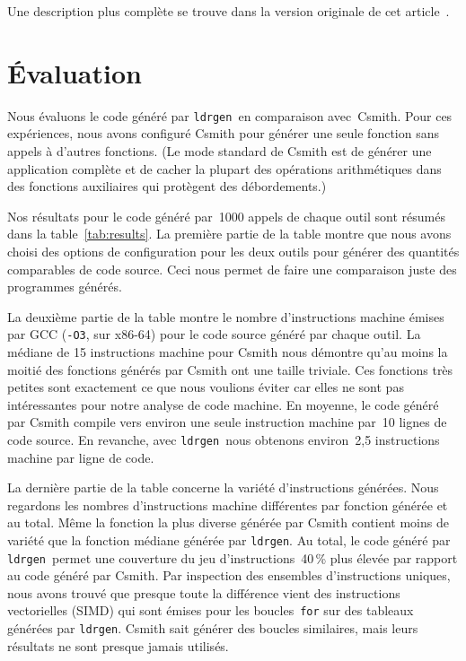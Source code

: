 \documentclass[a4paper]{easychair}
\newcommand\ldrgen{\texttt{ldrgen}}
\begin{document}

Une description plus complète se trouve dans la version originale de cet
article~\cite{ldrgen-2017}.


\section{Évaluation}

Nous évaluons le code généré par \ldrgen\ en comparaison avec~Csmith. Pour
ces expériences, nous avons configuré Csmith pour générer une seule
fonction sans appels à d'autres fonctions. (Le mode standard de Csmith est de
générer une application complète et de cacher la plupart des opérations
arithmétiques dans des fonctions auxiliaires qui protègent des
débordements.)

Nos résultats pour le code généré par~1000 appels de chaque outil sont
résumés dans la table~\ref{tab:results}. La première partie de la table
montre que nous avons choisi des options de configuration pour les deux
outils pour générer des quantités comparables de code source. Ceci nous
permet de faire une comparaison juste des programmes générés.

La deuxième partie de la table montre le nombre d'instructions machine
émises par GCC (\texttt{-O3}, sur x86-64) pour le code source généré par
chaque outil. La médiane de 15 instructions machine pour Csmith nous
démontre qu'au moins la moitié des fonctions générés par Csmith ont une
taille triviale. Ces fonctions très petites sont exactement ce que nous
voulions éviter car elles ne sont pas intéressantes pour notre analyse de
code machine. En moyenne, le code généré par Csmith compile vers environ une
seule instruction machine par~10 lignes de code source. En revanche, avec
\ldrgen\ nous obtenons environ~2,5 instructions machine par ligne de code.

La dernière partie de la table concerne la variété d'instructions générées.
Nous regardons les nombres d'instructions machine différentes par fonction
générée et au total. Même la fonction la plus diverse générée par Csmith
contient moins de variété que la fonction médiane générée par \ldrgen. Au
total, le code généré par \ldrgen\ permet une couverture du jeu
d'instructions~40\,\% plus élevée par rapport au code généré par Csmith. Par
inspection des ensembles d'instructions uniques, nous avons trouvé que
presque toute la différence vient des instructions vectorielles (SIMD) qui
sont émises pour les boucles~\texttt{for} sur des tableaux générées par
\ldrgen. Csmith sait générer des boucles similaires, mais leurs résultats ne
sont presque jamais utilisés.
\end{document}
